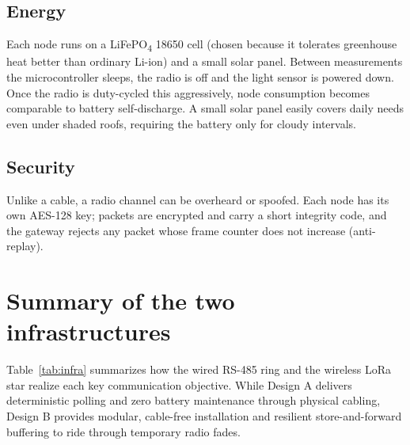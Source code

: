 \documentclass[11pt,a4paper]{report}
\begin{document}
\subsection{Energy}
Each node runs on a LiFePO\textsubscript{4} 18650 cell (chosen because it tolerates greenhouse heat better than ordinary Li-ion) and a small solar panel. Between measurements the microcontroller sleeps, the radio is off and the light sensor is powered down. Once the radio is duty-cycled this aggressively, node consumption becomes comparable to battery self-discharge. A small solar panel easily covers daily needs even under shaded roofs, requiring the battery only for cloudy intervals.

\subsection{Security}
Unlike a cable, a radio channel can be overheard or spoofed. Each node has its own AES-128 key; packets are encrypted and carry a short integrity code, and the gateway rejects any packet whose frame counter does not increase (anti-replay).

\clearpage
\section{Summary of the two infrastructures}
Table~\ref{tab:infra} summarizes how the wired RS-485 ring and the wireless LoRa star realize each key communication objective. While Design A delivers deterministic polling and zero battery maintenance through physical cabling, Design B provides modular, cable-free installation and resilient store-and-forward buffering to ride through temporary radio fades.
\end{document}
